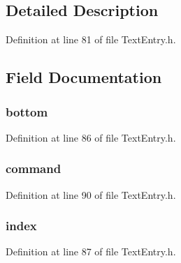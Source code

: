 \subsection{Detailed Description}


Definition at line 81 of file Text\+Entry.\+h.



\subsection{Field Documentation}
\hypertarget{struct_k_e_y_m_e_m_b_e_r_a85afe4f0d49adc47a2c4e5e7bf20f219}{}
\subsubsection[{bottom}]{ bottom}\label{struct_k_e_y_m_e_m_b_e_r_a85afe4f0d49adc47a2c4e5e7bf20f219}


Definition at line 86 of file Text\+Entry.\+h.

\hypertarget{struct_k_e_y_m_e_m_b_e_r_ade7c4147b4fe3608e0082cc4c1b92356}{}
\subsubsection[{command}]{ command}\label{struct_k_e_y_m_e_m_b_e_r_ade7c4147b4fe3608e0082cc4c1b92356}


Definition at line 90 of file Text\+Entry.\+h.

\hypertarget{struct_k_e_y_m_e_m_b_e_r_a38410e84c6bf7150043d7e743f41750d}{}
\subsubsection[{index}]{ index}\label{struct_k_e_y_m_e_m_b_e_r_a38410e84c6bf7150043d7e743f41750d}


Definition at line 87 of file Text\+Entry.\+h.

\hypertarget{struct_k_e_y_m_e_m_b_e_r_a24b9199fd8600849a2a3f9933474789d}{}
